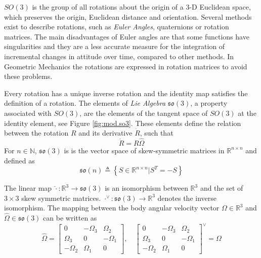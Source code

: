$ SO(3) $ is the group of all rotations about the origin of a 3-D Euclidean space, which preserves the origin, Euclidean distance and orientation.
Several methods exist to describe rotations, such as \textit{Euler Angles}, quaternions or rotation matrices. 
The main disadvantages of Euler angles are that some functions have singularities and they are a less accurate measure for the integration of incremental changes in attitude over time, compared to other methods. 
In Geometric Mechanics the rotations are expressed in rotation matrices to avoid these problems. 

Every rotation has a unique inverse rotation and the identity map satisfies the definition of a rotation. The elements of \textit{Lie Algebra} $ \mathfrak{so}(3) $, a property associated with $ SO(3) $, are the elements of the tangent space of $ SO(3) $ at the identity element, see Figure \ref{fig:mod.so3}. 
These elements define the relation between the rotation $ R $ and its derivative $ \dot{R} $, such that
\begin{equation}\label{eq:Rdot}
\dot{R} = R\hat{\Omega}
\end{equation}
For $ n\in \mathbb{N} $, $ \mathfrak{so}(3) $ is is the vector space of skew-symmetric matrices in $ \mathbb{R}^{n\times n} $ and defined as
\begin{equation}\label{eq:so3}
\mathfrak{so}(n) \triangleq \left\lbrace S\in \mathbb{R}^{n\times n}|S^T=-S\right\rbrace
\end{equation}

The linear map $ \hat{\cdot}:\mathbb{R}^3\rightarrow\mathfrak{so}(3) $ is an isomorphism between $ \mathbb{R}^3 $ and the set of $ 3\times 3 $ skew symmetric matrices. $ \cdot^\vee:\mathfrak{so}(3)\rightarrow\mathbb{R}^3 $ denotes the inverse isomorphism. The mapping between the body angular velocity vector $ \Omega\in\mathbb{R}^3 $ and  $ \hat{\Omega}\in\mathfrak{so}(3) $ can be written as
\begin{equation}\label{eq:mod.hatOmega}
\hat{\Omega}=\begin{bmatrix}
0&-\Omega_3&\Omega_2\\
\Omega_3&0&-\Omega_1\\
-\Omega_2&\Omega_1&0
\end{bmatrix},
\quad
\begin{bmatrix}
0&-\Omega_3&\Omega_2\\
\Omega_3&0&-\Omega_1\\
-\Omega_2&\Omega_1&0
\end{bmatrix}^\vee = \Omega
\end{equation}


